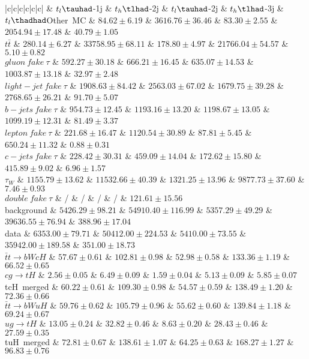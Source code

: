 \centering
\begin{tabular}{|c|c|c|c|c|c|} \toprule\toprule
 & $t_{l}\tauhad$-1j & $t_{h}\tlhad$-2j & $t_{l}\tauhad$-2j & $t_{h}\tlhad$-3j & $t_{l}\thadhad$Other~MC & $84.62\pm6.19$ & $3616.76\pm36.46$ & $83.30\pm2.55$ & $2054.94\pm17.48$ & $40.79\pm1.05$\\
$t\bar{t}$ & $280.14\pm6.27$ & $33758.95\pm68.11$ & $178.80\pm4.97$ & $21766.04\pm54.57$ & $5.10\pm0.82$\\
$gluon~fake~\tau$ & $592.27\pm30.18$ & $666.21\pm16.45$ & $635.07\pm14.53$ & $1003.87\pm13.18$ & $32.97\pm2.48$\\
$light-jet~fake~\tau$ & $1908.63\pm84.42$ & $2563.03\pm67.02$ & $1679.75\pm39.28$ & $2768.65\pm26.21$ & $91.70\pm5.07$\\
$b-jets~fake~\tau$ & $954.73\pm12.45$ & $1193.16\pm13.20$ & $1198.67\pm13.05$ & $1099.19\pm12.31$ & $81.49\pm3.37$\\
$lepton~fake~\tau$ & $221.68\pm16.47$ & $1120.54\pm30.89$ & $87.81\pm5.45$ & $650.24\pm11.32$ & $0.88\pm0.31$\\
$c-jets~fake~\tau$ & $228.42\pm30.31$ & $459.09\pm14.04$ & $172.62\pm15.80$ & $415.89\pm9.02$ & $6.96\pm1.57$\\
$\tau_{W}$ & $1155.79\pm13.62$ & $11532.66\pm40.39$ & $1321.25\pm13.96$ & $9877.73\pm37.60$ & $7.46\pm0.93$\\
$double~fake~\tau$ &  / &  / &  / &  / & $121.61\pm15.56$\\
background & $5426.29\pm98.21$ & $54910.40\pm116.99$ & $5357.29\pm49.29$ & $39636.55\pm76.94$ & $388.96\pm17.04$\\
data & $6353.00\pm79.71$ & $50412.00\pm224.53$ & $5410.00\pm73.55$ & $35942.00\pm189.58$ & $351.00\pm18.73$\\
$\bar{t}t\to bWcH$ & $57.67\pm0.61$ & $102.81\pm0.98$ & $52.98\pm0.58$ & $133.36\pm1.19$ & $66.52\pm0.65$\\
$cg\to tH$ & $2.56\pm0.05$ & $6.49\pm0.09$ & $1.59\pm0.04$ & $5.13\pm0.09$ & $5.85\pm0.07$\\
tcH~merged & $60.22\pm0.61$ & $109.30\pm0.98$ & $54.57\pm0.59$ & $138.49\pm1.20$ & $72.36\pm0.66$\\
$\bar{t}t\to bWuH$ & $59.76\pm0.62$ & $105.79\pm0.96$ & $55.62\pm0.60$ & $139.84\pm1.18$ & $69.24\pm0.67$\\
$ug\to tH$ & $13.05\pm0.24$ & $32.82\pm0.46$ & $8.63\pm0.20$ & $28.43\pm0.46$ & $27.59\pm0.35$\\
tuH~merged & $72.81\pm0.67$ & $138.61\pm1.07$ & $64.25\pm0.63$ & $168.27\pm1.27$ & $96.83\pm0.76$\\
\bottomrule\bottomrule\\
\end{tabular}
